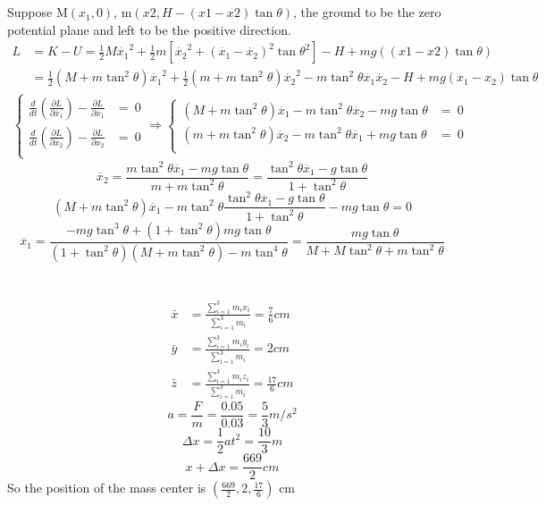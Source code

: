 \documentclass{article}
\begin{document}
\section{}
	Suppose M$(x_1,0)$, m$(x2,H-(x1-x2)\tan\theta)$, the ground to be the zero potential plane and left to be the positive direction.
	\begin{align*}
	L&=K-U=\frac{1}{2}M\dot{x_1}^2+\frac{1}{2}m[\dot{x_2}^2+(\dot{x_1}-\dot{x_2})^2\tan\theta^2]-H+mg((x1-x2)\tan\theta)\\
	&=\frac{1}{2}(M+m\tan^2\theta)\dot{x_1}^2+\frac{1}{2}(m+m\tan^2\theta)\dot{x_2}^2-m\tan^2\theta\dot{x_1}\dot{x_2}-H+mg(x_1-x_2)\tan\theta
	\end{align*}
	\begin{eqnarray*}
	\left\{
		\begin{array}{ll}
		\frac{d}{dt}\left(\frac{\partial L}{\partial\dot{x_1}}\right)-\frac{\partial L}{\partial x_1}&=\ 0\\
		\frac{d}{dt}\left(\frac{\partial L}{\partial\dot{x_2}}\right)-\frac{\partial L}{\partial x_2}&=\ 0\\
		\end{array}
	\right.\Longrightarrow\left\{
		\begin{array}{ll}
		(M+m\tan^2\theta)\ddot{x_1}-m\tan^2\theta\ddot{x_2}-mg\tan\theta&=\ 0\\
		(m+m\tan^2\theta)\ddot{x_2}-m\tan^2\theta\ddot{x_1}+mg\tan\theta&=\ 0\\
		\end{array}
	\right.
	\end{eqnarray*}
	$$\ddot{x_2}=\frac{m\tan^2\theta\ddot{x_1}-mg\tan\theta}{m+m\tan^2\theta}=\frac{\tan^2\theta\ddot{x_1}-g\tan\theta}{1+\tan^2\theta}$$
	$$(M+m\tan^2\theta)\ddot{x_1}-m\tan^2\theta\frac{\tan^2\theta\ddot{x_1}-g\tan\theta}{1+\tan^2\theta}-mg\tan\theta=0$$
	$$\ddot{x_1}=\frac{-mg\tan^3\theta+(1+\tan^2\theta)mg\tan\theta}{(1+\tan^2\theta)(M+m\tan^2\theta)-m\tan^4\theta}=\frac{mg\tan\theta}{M+M\tan^2\theta+m\tan^2\theta}$$

\section{}
	\begin{align*}
	\bar{x}&=\frac{\sum_{i=1}^3m_ix_i}{\sum_{i=1}^3m_i}=\frac{7}{6}cm\\
	\bar{y}&=\frac{\sum_{i=1}^3m_iy_i}{\sum_{i=1}^3m_i}=2cm\\
	\bar{z}&=\frac{\sum_{i=1}^3m_iz_i}{\sum_{i=1}^3m_i}=\frac{17}{6}cm
	\end{align*}
	$$a=\frac{F}{m}=\frac{0.05}{0.03}=\frac{5}{3}m/s^2$$
	$$\Delta x=\frac{1}{2}at^2=\frac{10}{3}m$$
	$$x+\Delta x=\frac{669}{2}cm$$
	So the position of the mass center is $(\frac{669}{2},2,\frac{17}{6})$ cm
	
\end{document}
